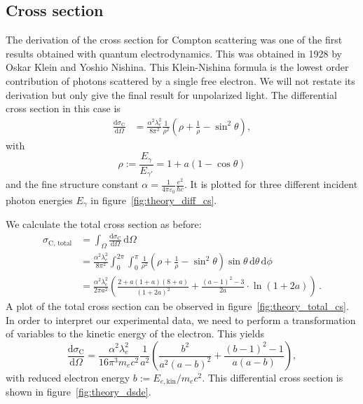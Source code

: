 \subsection{Cross section}
\label{sec:cross_section}
The derivation of the cross section for Compton scattering was one of the first results obtained with quantum 
electrodynamics. This was obtained in 1928 by Oskar Klein and Yoshio Nishina. This Klein-Nishina formula is the lowest 
order contribution of photons scattered by a single free electron. We will not restate its derivation 
but only give the final result for unpolarized light. The differential cross section in this case 
is\cite{schmueser2011feynman}
\begin{equation}
    \begin{split}
        \frac{\text{d} \sigma_\text{C}}{\text{d} \Omega} 
        &= \frac{\alpha^2 \lambda_e^2}{8 \pi^2} \frac{1}{\rho^2}\left(\rho + \frac{1}{\rho} - \sin^2\theta\right) ,
        \label{eq:kn_diff}
    \end{split}
\end{equation}
with 
\begin{equation}
    \rho := \frac{E_\gamma}{E_{\gamma'}}  = 1 + a(1 - \cos\theta) 
    \label{eq:rho}
\end{equation}
and the fine structure constant $\alpha = \frac{1}{4 \pi \varepsilon_0} \frac{e^2}{\hbar c}$.   
It is plotted for three different incident photon energies $E_\gamma$ in figure~\ref{fig:theory_diff_cs}. 

We calculate the total cross section as before:\cite{ver2}
\begin{equation}
    \begin{split}
        \sigma_\text{C, total} &= \int_\Omega \! \frac{\text{d} \sigma_\text{C}}{\text{d} \Omega}  \, \text{d}\Omega \\
            &= \frac{\alpha^2 \lambda_e^2}{8\pi^2} \int_0^{2\pi} \! \int_0^{\pi} \! 
        \frac{1}{\rho^2}\left(\rho + \frac{1}{\rho} - \sin^2\theta\right) \sin\theta \, \text{d}\theta  \, \text{d}\phi \\
        &=\frac{\alpha^2 \lambda_e^2}{2\pi a^2} \left(
            \frac{2 + a(1 + a)(8 + a)}{(1 + 2a)^2} + 
            \frac{(a - 1)^2 - 3}{2a} \cdot \ln(1 + 2a)\right)   \,.
        \label{eq:total_compton}
    \end{split}
\end{equation}
A plot of the total cross section can be observed in figure~\ref{fig:theory_total_cs}. In order to interpret our 
experimental data, we need to perform a transformation of variables to the kinetic energy of the electron. This 
yields\cite{ver2}
\begin{equation}
    \frac{\text{d} \sigma_\text{C}}{\text{d} \Omega} 
    = \frac{\alpha^2 \lambda_e^2}{16 \pi^3 m_e c^2}  \frac{1}{a^2}\left(
        \frac{b^2}{a^2(a - b)^2} + \frac{(b - 1)^2 - 1}{a (a - b)} \right) ,
    \label{eq:dode}
\end{equation}
with reduced electron energy $b := E_{e, \text{kin}} / m_ec^2$. This differential cross section is shown in 
figure~\ref{fig:theory_dsde}.


